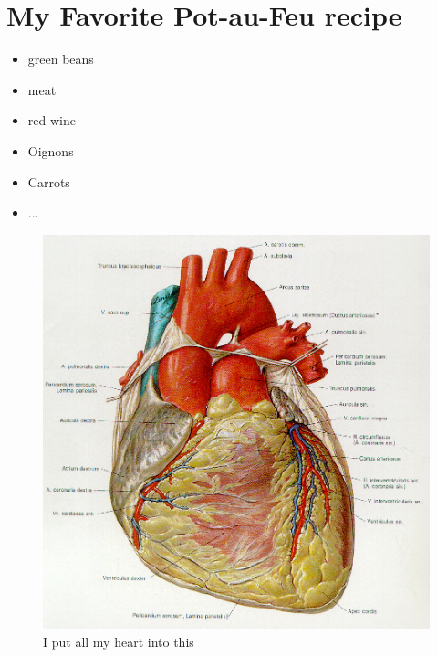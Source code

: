 \documentclass{article}
\begin{document}
\section{My Favorite Pot-au-Feu recipe}

\begin{itemize}
 \item green beans
 \item meat
 \item red wine
 \item Oignons
 \item Carrots 
 \item ... 
\end{itemize}
 
\begin{figure}[h]
  \centering
  \includegraphics[width=.6\textwidth]{figure1.jpg}
  \caption{I put all my heart into this}
\end{figure}
\end{document}
